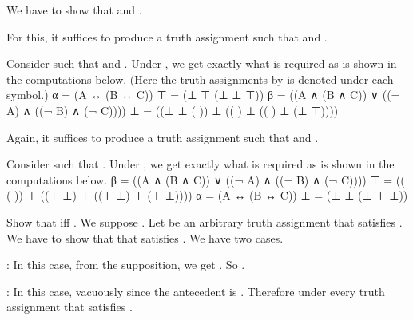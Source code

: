 		We have to show that  and .

		For this, it suffices to produce a truth assignment  such that  and .

		Consider  such that  and . Under , we get exactly what is required as is shown in the computations below. (Here the truth assignments by  is denoted under each symbol.)
		\startformula  \startalign
			\NC  α =  \NC  (A  \NC  ↔  \NC  (B  \NC  ↔  \NC  C))  \NR
			\NC  ⊤ =  \NC  (⊥  \NC  ⊤  \NC  (⊥  \NC  ⊥  \NC  ⊤))  \NR
		\stopalign  \stopformula
		\startformula  \startalign
			\NC  β =  \NC  ((A  \NC  ∧  \NC  (B  \NC  ∧  \NC  C))  \NC  ∨  \NC  ((¬  \NC  A)  \NC  ∧  \NC  ((¬  \NC  B)  \NC  ∧  \NC  (¬  \NC  C))))  \NR
			\NC  ⊥ =  \NC  ((⊥  \NC  ⊥  \NC  (   \NC     \NC   ))  \NC  ⊥  \NC  ((   \NC   )  \NC  ⊥  \NC  ((   \NC   )  \NC  ⊥  \NC  (⊥  \NC  ⊤))))  \NR
		\stopalign  \stopformula

		\bold{(\m{β ⊭ α})}
		Again, it suffices to produce a truth assignment  such that  and \m{\bar{v}(α) = ⊥}.

		Consider  such that . Under , we get exactly what is required as is shown in the computations below.
		\startformula  \startalign
			\NC  β =  \NC  ((A  \NC  ∧  \NC  (B  \NC  ∧  \NC  C))  \NC  ∨  \NC  ((¬  \NC  A)  \NC  ∧  \NC  ((¬  \NC  B)  \NC  ∧  \NC  (¬  \NC  C))))  \NR
			\NC  ⊤ =  \NC  ((   \NC     \NC  (   \NC     \NC   ))  \NC  ⊤  \NC  ((⊤  \NC  ⊥)  \NC  ⊤  \NC  ((⊤  \NC  ⊥)  \NC  ⊤  \NC  (⊤  \NC  ⊥))))  \NR
		\stopalign  \stopformula
		\startformula  \startalign
			\NC  α =  \NC  (A  \NC  ↔  \NC  (B  \NC  ↔  \NC  C))  \NR
			\NC  ⊥ =  \NC  (⊥  \NC  ⊥  \NC  (⊥  \NC  ⊤  \NC  ⊥))  \NR
		\stopalign  \stopformula
	\stopproof

	\startproposition [title={Exercise 1.2.4a}]
		Show that  iff .
	\stopproposition
	\startproof
		We suppose . Let  be an arbitrary truth assignment that satisfies . We have to show that  that satisfies . We have two cases.
		\startitemize[i, joinedup]
			\item  {}: In this case, from the supposition, we get . So .
			\item  {}: In this case,  vacuously since the antecedent is .
		\stopitemize
		Therefore  under every truth assignment that satisfies .

